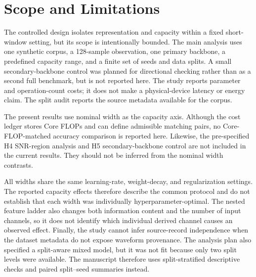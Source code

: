\section{Scope and Limitations}
\label{sec:limitations}
The controlled design isolates representation and capacity within a fixed
short-window setting, but its scope is intentionally bounded. The main analysis
uses one synthetic corpus, a 128-sample observation, one primary backbone, a
predefined capacity range, and a finite set of seeds and data splits. A small
secondary-backbone control was planned for directional checking rather than as a
second full benchmark, but is not reported here. The study reports parameter and operation-count costs;
it does not make a physical-device latency or energy claim. The split audit
reports the source metadata available for the corpus.

The present results use nominal width as the capacity axis. Although the cost
ledger stores Core FLOPs and can define admissible matching pairs, no
Core-FLOP-matched accuracy comparison is reported here. Likewise, the
pre-specified H4 SNR-region analysis and H5 secondary-backbone control are not
included in the current results. They should not be inferred from the nominal
width contrasts.

All widths share the same learning-rate, weight-decay, and regularization
settings. The reported capacity effects therefore describe the common protocol
and do not establish that each width was individually hyperparameter-optimal.
The nested feature ladder also changes both information content and the number
of input channels, so it does not identify which individual derived channel
causes an observed effect. Finally, the study cannot infer source-record
independence when the dataset metadata do not expose waveform provenance.
The analysis plan also specified a split-aware mixed model, but it was not fit
because only two split levels were available. The manuscript therefore uses
split-stratified descriptive checks and paired split--seed summaries instead.
